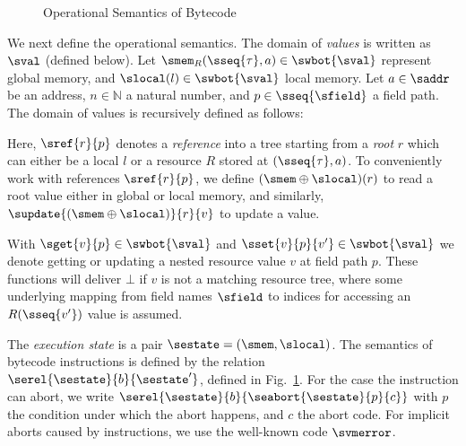 \begin{figure}[t!]
  \caption{Operational Semantics of Bytecode}
  \label{fig:Semantics}
\end{figure}



We next define the operational semantics. The domain of \emph{values} is written
as $\sval$ (defined below).  Let $\smem_R(\sseq{\tau}, a) \in \swbot{\sval}$
represent global memory, and $\slocal(l) \in \swbot{\sval}$ local
memory. Let $a \in \saddr$ be an address, $n \in \mathbb{N}$ a natural number,
and $p \in \sseq{\sfield}$ a field path.  The domain of values is recursively
defined as follows:
Here, $\sref{r}{p}$ denotes a \emph{reference} into a tree starting from a
\emph{root} $r$ which can either be a local $l$ or a resource $R$ stored at
$(\sseq{\tau},a)$. To conveniently work with references $\sref{r}{p}$, we define
$(\smem \oplus \slocal)(r)$ to read a root value either in global or local
memory, and similarly, $\supdate{(\smem \oplus \slocal)}{r}{v}$ to update a
value.

With $\sget{v}{p} \in \swbot{\sval}$ and $\sset{v}{p}{v'} \in \swbot{\sval}$ we
denote getting or updating a nested resource value $v$ at field path $p$. These
functions will deliver $\bot$ if $v$ is not a matching resource tree, where some
underlying mapping from field names $\sfield$ to indices for accessing an
$R(\sseq{v'})$ value is assumed.

The \emph{execution state} is a pair $\sestate = (\smem, \slocal)$. The
semantics of bytecode instructions is defined by the relation
$\serel{\sestate}{b}{\sestate'}$, defined in Fig.~\ref{fig:Semantics}. For the
case the instruction can abort, we write
$\serel{\sestate}{b}{\seabort{\sestate}{p}{c}}$ with $p$ the condition under
which the abort happens, and $c$ the abort code. For implicit aborts caused by
instructions, we use the well-known code $\svmerror$.

